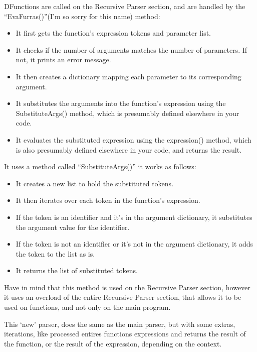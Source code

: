 DFunctions are called on the Recursive Parser section, and are handled by the ``EvaFurras{()}''{(I'm so sorry for this name)} method:
\begin{itemize}
    \item It first gets the function's expression tokens and parameter list.
    \item It checks if the number of arguments matches the number of parameters. If not, it prints an error message.
    \item It then creates a dictionary mapping each parameter to its corresponding argument.
    \item It substitutes the arguments into the function's expression using the SubstituteArgs{()} method, which is presumably defined elsewhere in your code.
    \item It evaluates the substituted expression using the expression{()} method, which is also presumably defined elsewhere in your code, and returns the result.
\end{itemize}
It uses a method called ``SubstituteArgs{()}'' it works as follows:
\begin{itemize}
    \item It creates a new list to hold the substituted tokens.
    \item It then iterates over each token in the function's expression.
    \item If the token is an identifier and it's in the argument dictionary, it substitutes the argument value for the identifier.
    \item If the token is not an identifier or it's not in the argument dictionary, it adds the token to the list as is.
    \item It returns the list of substituted tokens.
\end{itemize}
Have in mind that this method is used on the Recursive Parser section, however it uses an overload of the entire Recursive Parser section, that allows it to be used on functions, and not only on the main program.

This `new' parser, does the same as the main parser, but with some extras, iterations, like processed entires functions expressions and returns the result of the function, or the result of the expression, depending on the context.

